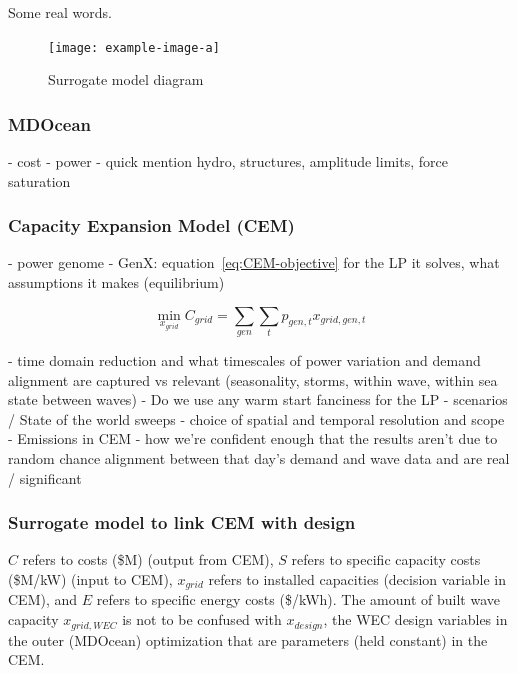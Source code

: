\documentclass[10pt,twoside]{article}
\begin{document}
\lipsum[1]

Some real words.

\begin{figure}
    \centering
    \texttt{[image: example-image-a]}
    \caption{Surrogate model diagram}
    \label{fig:surrogate}
\end{figure}

\subsubsection{MDOcean}

    -  cost
    -  power
    -  quick mention hydro, structures, amplitude limits, force saturation
\lipsum[1]

\subsubsection{Capacity Expansion Model (CEM)}

    -  power genome
    -  GenX: equation~\eqref{eq:CEM-objective} for the LP it solves, what assumptions it makes (equilibrium)

\begin{equation}\label{eq:CEM-objective}
    \min_{x_{grid}} C_{grid} = \sum_{gen} \sum_{t} p_{gen,t} x_{grid,gen,t}
\end{equation}

    -  time domain reduction and what timescales of power variation and demand alignment are captured vs relevant (seasonality, storms, within wave, within sea state between waves)
    -  Do we use any warm start fanciness for the LP
    -  scenarios / State of the world sweeps
    -  choice of spatial and temporal resolution and scope
    -  Emissions in CEM
    -  how we're confident enough that the results aren't due to random chance alignment between that day's demand and wave data and are real / significant

\subsubsection{Surrogate model to link CEM with design}
$C$ refers to costs (\$M) (output from CEM), $S$ refers to specific capacity costs (\$M/kW) (input to CEM), $x_{grid}$ refers to installed capacities (decision variable in CEM), and $E$ refers to specific energy costs (\$/kWh). The amount of built wave capacity $x_{grid,WEC}$ is not to be confused with $x_{design}$, the WEC design variables in the outer (MDOcean) optimization that are parameters (held constant) in the CEM.
\end{document}
